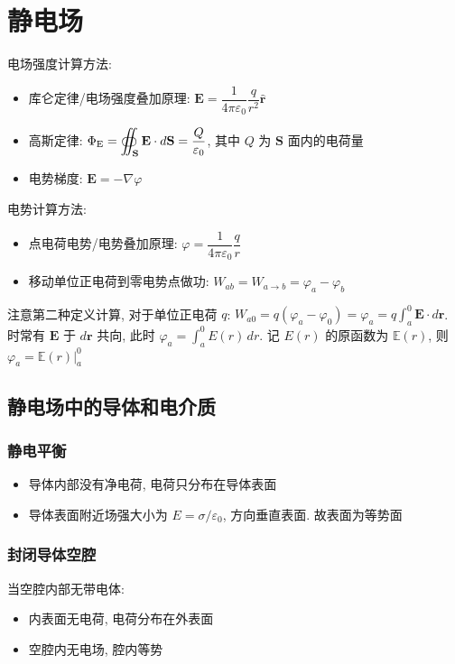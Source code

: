 \documentclass[UTF8]{ctexart}
\begin{document}
\newpage
\section{静电场} 
电场强度计算方法:
\begin{itemize}
    \item 库仑定律/电场强度叠加原理: $\displaystyle \mathbf E = \dfrac{1}{4 \pi \varepsilon_0} \dfrac{q}{r^2} \mathbf{\hat r} $
    \item 高斯定律: $\displaystyle \Phi_{\rm E} = \oiint_{\mathbf S} \mathbf E \cdot d\mathbf S = \dfrac{Q}{\varepsilon_0} $, 其中 $ Q $ 为 $ \mathbf S $ 面内的电荷量
    \item 电势梯度: $ \mathbf E = - \nabla \varphi $
\end{itemize}

电势计算方法:
\begin{itemize}
    \item 点电荷电势/电势叠加原理: $ \displaystyle \varphi = \dfrac{1}{4 \pi \varepsilon_0} \dfrac{q}{r}$
    \item 移动单位正电荷到零电势点做功: $ W_{ab} = W_{a \to b} = \varphi_a - \varphi_b $
\end{itemize}

注意第二种定义计算, 对于单位正电荷 $ q $: $\displaystyle W_{a0} = q(\varphi_a - \varphi_0) = \varphi_a = q \int_a^0 \mathbf E \cdot d\mathbf r $. 时常有 $ \mathbf E $ 于 $ d\mathbf r $ 共向, 此时 $\displaystyle \varphi_a = \int_a^0 E(r) \,dr $. 记 $ E(r) $ 的原函数为 $ \mathbb E(r) $, 则 $ \varphi_a =  \mathbb E(r) |_a^0 $



\subsection{静电场中的导体和电介质}
\subsubsection{静电平衡}
\begin{itemize}
    \item 导体内部没有净电荷, 电荷只分布在导体表面
    \item 导体表面附近场强大小为 $ E = \sigma / \varepsilon_0 $, 方向垂直表面. 故表面为等势面
\end{itemize}

\subsubsection{封闭导体空腔}
当空腔内部无带电体:
\begin{itemize}
    \item 内表面无电荷, 电荷分布在外表面
    \item 空腔内无电场, 腔内等势
\end{itemize}
\end{document}
